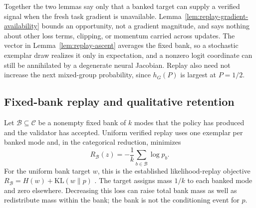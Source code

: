 \begin{remark}
Together the two lemmas say only that a banked target can supply a verified
signal when the fresh task gradient is unavailable. Lemma~\ref{lem:replay-gradient-availability}
bounds an opportunity, not a gradient magnitude, and says nothing about other
loss terms, clipping, or momentum carried across updates. The vector in
Lemma~\ref{lem:replay-ascent} averages the fixed bank, so a stochastic
exemplar draw realizes it only in expectation, and a nonzero logit coordinate
can still be annihilated by a degenerate neural Jacobian. Replay also need not
increase the next mixed-group probability, since $h_G(P)$ is largest at
$P=1/2$.
\end{remark}

\subsection{Fixed-bank replay and qualitative retention}
\label{app:theory-replay}

Let $\mathcal B\subseteq\mathcal C$ be a nonempty fixed bank of $k$ modes that
the policy has produced and the validator has accepted. Uniform verified replay
uses one exemplar per banked mode and, in the categorical reduction, minimizes
\begin{equation}
  R_{\mathcal B}(z)
  =-\frac1k\sum_{b\in\mathcal B}\log p_b.
  \label{eq:verified-replay-loss}
\end{equation}
For the uniform bank target $w$, this is the established likelihood-replay
objective $R_{\mathcal B}=H(w)+\mathrm{KL}(w\|p)$
\citep[App.~D.1, version~4]{li2025divergence}. The target assigns mass
$1/k$ to each banked mode and zero elsewhere. Decreasing this loss can raise
total bank mass as well as redistribute mass within the bank; the bank is
not the conditioning event for $p$.

